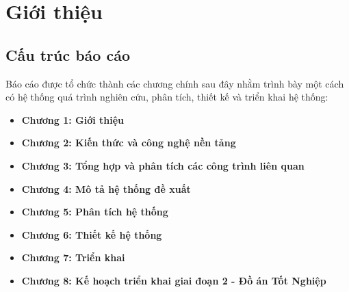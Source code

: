 \documentclass[12pt,a4paper]{article}
\theoremstyle{definition}
\begin{document}
\cleardoublepage
\pagestyle{empty}

\begin{singlespace}
\tableofcontents
\end{singlespace}

\cleardoublepage
\begin{singlespace}
\listoffigures
\end{singlespace}

\cleardoublepage
\begin{singlespace}
\listoftables
\end{singlespace}

\cleardoublepage
\pagestyle{fancy}

\setcounter{page}{1}
\section{Giới thiệu}




\subsection{Cấu trúc báo cáo}

Báo cáo được tổ chức thành các chương chính sau đây nhằm trình bày một cách có hệ thống quá trình nghiên cứu, phân tích, thiết kế và triển khai hệ thống:

\begin{itemize}
    \item \textbf{Chương 1: Giới thiệu}
    \item \textbf{Chương 2: Kiến thức và công nghệ nền tảng}
    \item \textbf{Chương 3: Tổng hợp và phân tích các công trình liên quan}
    \item \textbf{Chương 4: Mô tả hệ thống đề xuất}
    \item \textbf{Chương 5: Phân tích hệ thống}
    \item \textbf{Chương 6: Thiết kế hệ thống}
    \item \textbf{Chương 7: Triển khai}
    \item \textbf{Chương 8: Kế hoạch triển khai giai đoạn 2 - Đồ án Tốt Nghiệp}
  \end{itemize}
\end{document}
